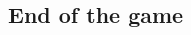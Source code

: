 \documentclass{article}
\begin{document}
\begin{CJK}{UTF8}{min}












\section{End of the game}


\end{CJK}
\end{document}
